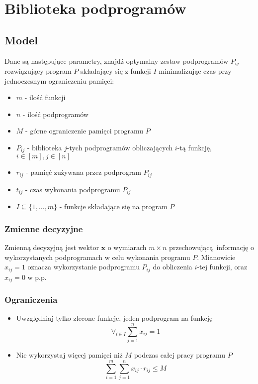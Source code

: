 \section{Biblioteka podprogramów}

\subsection{Model}
Dane są następujące parametry, znajdź optymalny zestaw podprogramów $P_{ij}$ rozwiązujący program $P$ składający się z funkcji $I$ minimalizując czas przy jednoczesnym ograniczeniu pamięci:
\begin{itemize}
    \item $m$ - ilość funkcji
    \item $n$ - ilość podprogramów
    \item $M$ - górne ograniczenie pamięci programu $P$
    \item $P_{ij}$ - biblioteka $j$-tych podprogramów obliczających $i$-tą funkcję, $i\in[m], j\in[n]$
    \item $r_{ij}$ - pamięć zużywana przez podprogram $P_{ij}$
    \item $t_{ij}$ - czas wykonania podprogramu $P_{ij}$
    \item $I \subseteq \{1,\ldots,m\}$ - funkcje składające się na program $P$
\end{itemize}

\subsubsection{Zmienne decyzyjne}
Zmienną decyzyjną jest wektor $\mathbf{x}$ o wymiarach $m \times n$ przechowującą informację o wykorzystanych podprogramach w celu wykonania programu $P$.  Mianowicie $x_{ij} = 1$ oznacza wykorzystanie podprogramu $P_{ij}$ do obliczenia $i$-tej funkcji, oraz $x_{ij} = 0$ w p.p.

\subsubsection{Ograniczenia}
\begin{itemize}
    \item Uwzględniaj tylko zlecone funkcje, jeden podprogram na funkcję $$ \forall_{i\in I} \sum_{j=1}^{n} x_{ij} = 1 $$
    \item Nie wykorzystaj więcej pamięci niż $M$ podczas całej pracy programu $P$
    $$ \sum_{i=1}^{m} \sum_{j=1}^{n} x_{ij} \cdot r_{ij} \leq M $$
\end{itemize}

